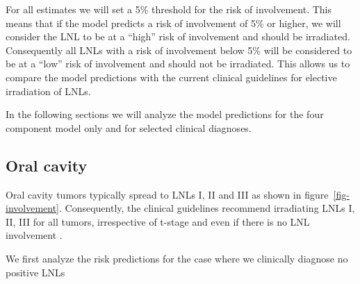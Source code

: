 \documentclass[
  sn-mathphys-num,
]{sn-jnl}
\begin{document}
For all estimates we will set a 5\% threshold for the risk of
involvement. This means that if the model predicts a risk of involvement
of 5\% or higher, we will consider the LNL to be at a ``high'' risk of
involvement and should be irradiated. Consequently all LNLs with a risk
of involvement below 5\% will be considered to be at a ``low'' risk of
involvement and should not be irradiated. This allows us to compare the
model predictions with the current clinical guidelines for elective
irradiation of LNLs.

In the following sections we will analyze the model predictions for the
four component model only and for selected clinical diagnoses.

\subsection{Oral cavity}\label{oral-cavity}

Oral cavity tumors typically spread to LNLs I, II and III as shown in
figure~\ref{fig-involvement}. Consequently, the clinical guidelines
recommend irradiating LNLs I, II, III for all tumors, irrespective of
t-stage and even if there is no LNL involvement
\citep{biau_selection_2019}.

We first analyze the risk predictions for the case where we clinically
diagnose no positive LNLs
\end{document}

